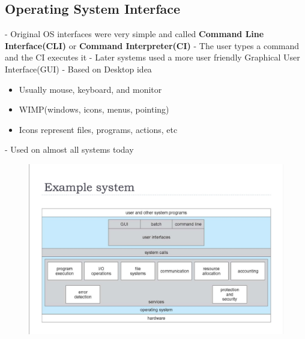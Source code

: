 \documentclass[11pt]{article}
\theoremstyle{definition}
\begin{document}
    \subsection{Operating System Interface}
        - Original OS interfaces were very simple and called \textbf{Command Line Interface(CLI)} or \textbf{Command Interpreter(CI)}
        - The user types a command and the CI executes it
        - Later systems used a more user friendly Graphical User Interface(GUI)
        - Based on Desktop idea
            \begin{itemize}
                \item Usually mouse, keyboard, and monitor
                \item WIMP(windows, icons, menus, pointing)
                \item Icons represent files, programs, actions, etc
            \end{itemize}
        - Used on almost all systems today
        \begin{figure}
            \centering
            \includegraphics[width=1.0\linewidth]{img/Example_system.jpg}
            \label{fig:enter-label}
        \end{figure}
\end{document}
